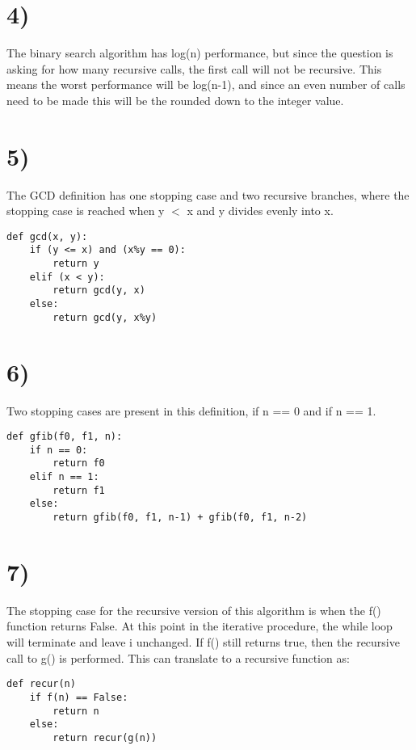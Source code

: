 \documentclass[a4paper,11pt]{article}
\begin{document}

\section*{4)} 

The binary search algorithm has log(n) performance, but since the question is asking for how many recursive calls, the first call will not be recursive.  This means the worst performance will be log(n-1), and since an even number of calls need to be made this will be the rounded down to the integer value.


\section*{5)}
The GCD definition has one stopping case and two recursive branches, where the stopping case is reached when y $<$ x and y divides evenly into x.
\begin{verbatim}
def gcd(x, y):
    if (y <= x) and (x%y == 0):
        return y
    elif (x < y):
        return gcd(y, x)
    else:
        return gcd(y, x%y)
\end{verbatim}


\section*{6)}
Two stopping cases are present in this definition, if n == 0 and if n == 1.
\begin{verbatim}
def gfib(f0, f1, n):
    if n == 0:
        return f0
    elif n == 1:
        return f1
    else:
        return gfib(f0, f1, n-1) + gfib(f0, f1, n-2)
\end{verbatim}


\section*{7)}
The stopping case for the recursive version of this algorithm is when the f() function returns False.  At this point in the iterative
procedure, the while loop will terminate and leave i unchanged.  If f() still returns true, then the recursive call to g() is performed.  
This can translate to a recursive function as:
\begin{verbatim}
def recur(n)
    if f(n) == False:
        return n
    else:
        return recur(g(n))
\end{verbatim}
\end{document}
